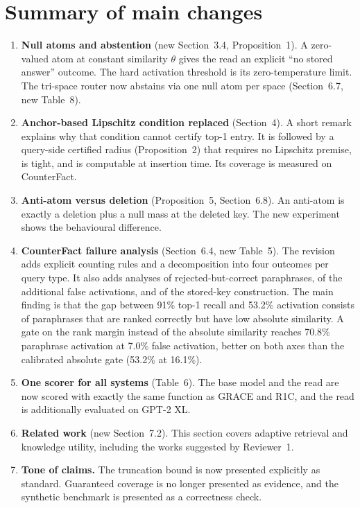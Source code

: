 \documentclass[11pt]{article}
\begin{document}
\section*{Summary of main changes}
\begin{enumerate}[leftmargin=*]
\item \textbf{Null atoms and abstention} (new Section~3.4, Proposition~1). A zero-valued atom at constant similarity $\theta$ gives the read an explicit ``no stored answer'' outcome. The hard activation threshold is its zero-temperature limit. The tri-space router now abstains via one null atom per space (Section~6.7, new Table~8).
\item \textbf{Anchor-based Lipschitz condition replaced} (Section~4). A short remark explains why that condition cannot certify top-1 entry. It is followed by a query-side certified radius (Proposition~2) that requires no Lipschitz premise, is tight, and is computable at insertion time. Its coverage is measured on CounterFact.
\item \textbf{Anti-atom versus deletion} (Proposition~5, Section~6.8). An anti-atom is exactly a deletion plus a null mass at the deleted key. The new experiment shows the behavioural difference.
\item \textbf{CounterFact failure analysis} (Section~6.4, new Table~5). The revision adds explicit counting rules and a decomposition into four outcomes per query type. It also adds analyses of rejected-but-correct paraphrases, of the additional false activations, and of the stored-key construction. The main finding is that the gap between 91\% top-1 recall and 53.2\% activation consists of paraphrases that are ranked correctly but have low absolute similarity. A gate on the rank margin instead of the absolute similarity reaches 70.8\% paraphrase activation at 7.0\% false activation, better on both axes than the calibrated absolute gate (53.2\% at 16.1\%).
\item \textbf{One scorer for all systems} (Table~6). The base model and the read are now scored with exactly the same function as GRACE and R1C, and the read is additionally evaluated on GPT-2 XL.
\item \textbf{Related work} (new Section~7.2). This section covers adaptive retrieval and knowledge utility, including the works suggested by Reviewer~1.
\item \textbf{Tone of claims.} The truncation bound is now presented explicitly as standard. Guaranteed coverage is no longer presented as evidence, and the synthetic benchmark is presented as a correctness check.
\end{enumerate}
\end{document}
